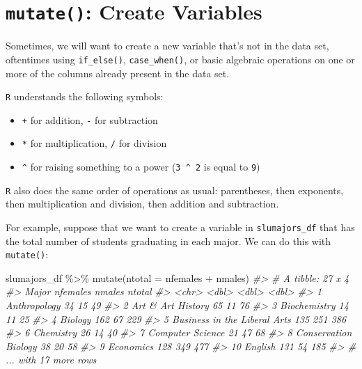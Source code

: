 \documentclass[
]{book}
\newenvironment{Shaded}{\begin{snugshade}}{\end{snugshade}}
\newcommand{\AttributeTok}[1]{\textcolor[rgb]{0.77,0.63,0.00}{#1}}
\newcommand{\CommentTok}[1]{\textcolor[rgb]{0.56,0.35,0.01}{\textit{#1}}}
\newcommand{\FunctionTok}[1]{\textcolor[rgb]{0.00,0.00,0.00}{#1}}
\newcommand{\NormalTok}[1]{#1}
\newcommand{\SpecialCharTok}[1]{\textcolor[rgb]{0.00,0.00,0.00}{#1}}
\providecommand{\tightlist}{%
  \setlength{\itemsep}{0pt}\setlength{\parskip}{0pt}}
\begin{document}
\hypertarget{mutate-create-variables}{%
\section{\texorpdfstring{\texttt{mutate()}: Create Variables}{mutate(): Create Variables}}\label{mutate-create-variables}}

Sometimes, we will want to create a new variable that's not in the data set, oftentimes using \texttt{if\_else()}, \texttt{case\_when()}, or basic algebraic operations on one or more of the columns already present in the data set.

\texttt{R} understands the following symbols:

\begin{itemize}
\tightlist
\item
  \texttt{+} for addition, \texttt{-} for subtraction
\item
  \texttt{*} for multiplication, \texttt{/} for division
\item
  \texttt{\^{}} for raising something to a power (\texttt{3\ \^{}\ 2} is equal to \texttt{9})
\end{itemize}

\texttt{R} also does the same order of operations as usual: parentheses, then exponents, then multiplication and division, then addition and subtraction.

For example, suppose that we want to create a variable in \texttt{slumajors\_df} that has the total number of students graduating in each major. We can do this with \texttt{mutate()}:

\begin{Shaded}
\begin{Highlighting}[]
\NormalTok{slumajors\_df }\SpecialCharTok{\%\textgreater{}\%} \FunctionTok{mutate}\NormalTok{(}\AttributeTok{ntotal =}\NormalTok{ nfemales }\SpecialCharTok{+}\NormalTok{ nmales)}
\CommentTok{\#\textgreater{} \# A tibble: 27 x 4}
\CommentTok{\#\textgreater{}    Major                        nfemales nmales ntotal}
\CommentTok{\#\textgreater{}    \textless{}chr\textgreater{}                           \textless{}dbl\textgreater{}  \textless{}dbl\textgreater{}  \textless{}dbl\textgreater{}}
\CommentTok{\#\textgreater{}  1 Anthropology                       34     15     49}
\CommentTok{\#\textgreater{}  2 Art \& Art History                  65     11     76}
\CommentTok{\#\textgreater{}  3 Biochemistry                       14     11     25}
\CommentTok{\#\textgreater{}  4 Biology                           162     67    229}
\CommentTok{\#\textgreater{}  5 Business in the Liberal Arts      135    251    386}
\CommentTok{\#\textgreater{}  6 Chemistry                          26     14     40}
\CommentTok{\#\textgreater{}  7 Computer Science                   21     47     68}
\CommentTok{\#\textgreater{}  8 Conservation Biology               38     20     58}
\CommentTok{\#\textgreater{}  9 Economics                         128    349    477}
\CommentTok{\#\textgreater{} 10 English                           131     54    185}
\CommentTok{\#\textgreater{} \# ... with 17 more rows}
\end{Highlighting}
\end{Shaded}
\end{document}
